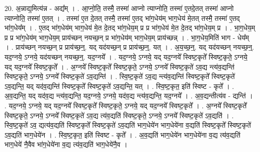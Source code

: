 \documentclass[17pt]{extarticle}
\begin{document}
20. अ॒न्नाद्य॒मित्य॑न्न - अद्य᳚म् । . आ॒प्नो॒ति॒ तस्मै॒ तस्मा॑ आप्नो त्याप्नोति॒ तस्मा॑ ए॒तदे॒तत् तस्मा॑ आप्नो त्याप्नोति॒ तस्मा॑ ए॒तत् । . तस्मा॑ ए॒त दे॒तत् तस्मै॒ तस्मा॑ ए॒तद् भा॑ग॒धेय॑म् भाग॒धेय॑ मे॒तत् तस्मै॒ तस्मा॑ ए॒तद् भा॑ग॒धेय᳚म् । . ए॒तद् भा॑ग॒धेय॑म् भाग॒धेय॑ मे॒त दे॒तद् भा॑ग॒धेय॒म् प्र प्र भा॑ग॒धेय॑ मे॒त दे॒तद् भा॑ग॒धेय॒म् प्र । . भा॒ग॒धेय॒म् प्र प्र भा॑ग॒धेय॑म् भाग॒धेय॒म् प्राय॑च्छन् नयच्छ॒न् प्र भा॑ग॒धेय॑म् भाग॒धेय॒म् प्राय॑च्छन्न् । . भा॒ग॒धेय॒मिति॑ भाग - धेय᳚म् । . प्राय॑च्छन् नयच्छ॒न् प्र प्राय॑च्छ॒न्॒. यद् यद॑यच्छ॒न् प्र प्राय॑च्छ॒न्॒. यत् । . अ॒य॒च्छ॒न्॒. यद् यद॑यच्छन् नयच्छ॒न्॒. यद॒ग्नये॒ ऽग्नये॒ यद॑यच्छन् नयच्छ॒न्॒. यद॒ग्नये᳚ । . यद॒ग्नये॒ ऽग्नये॒ यद् यद॒ग्नये᳚ स्विष्ट॒कृते᳚ स्विष्ट॒कृते॒ ऽग्नये॒ यद् यद॒ग्नये᳚ स्विष्ट॒कृते᳚ । . अ॒ग्नये᳚ स्विष्ट॒कृते᳚ स्विष्ट॒कृते॒ ऽग्नये॒ ऽग्नये᳚ स्विष्ट॒कृते॑ ऽव॒द्य न्त्य॑व॒द्यन्ति॑ स्विष्ट॒कृते॒ ऽग्नये॒ ऽग्नये᳚ स्विष्ट॒कृते॑ ऽव॒द्यन्ति॑ । . स्वि॒ष्ट॒कृते॑ ऽव॒द्य न्त्य॑व॒द्यन्ति॑ स्विष्ट॒कृते᳚ स्विष्ट॒कृते॑ ऽव॒द्यन्ति॒ यद् यद॑व॒द्यन्ति॑ स्विष्ट॒कृते᳚ स्विष्ट॒कृते॑ ऽव॒द्यन्ति॒ यत् । . स्वि॒ष्ट॒कृत॒ इति॑ स्विष्ट - कृते᳚ । . अ॒व॒द्यन्ति॒ यद् यद॑व॒द्य न्त्य॑व॒द्यन्ति॒ यद॒ग्नये॒ ऽग्नये॒ यद॑व॒द्य न्त्य॑व॒द्यन्ति॒ यद॒ग्नये᳚ । . अ॒व॒द्यन्तीत्य॑व - द्यन्ति॑ । . यद॒ग्नये॒ ऽग्नये॒ यद् यद॒ग्नये᳚ स्विष्ट॒कृते᳚ स्विष्ट॒कृते॒ ऽग्नये॒ यद् यद॒ग्नये᳚ स्विष्ट॒कृते᳚ । . अ॒ग्नये᳚ स्विष्ट॒कृते᳚ स्विष्ट॒कृते॒ ऽग्नये॒ ऽग्नये᳚ स्विष्ट॒कृते॑ ऽव॒द्य त्य॑व॒द्यति॑ स्विष्ट॒कृते॒ ऽग्नये॒ ऽग्नये᳚ स्विष्ट॒कृते॑ ऽव॒द्यति॑ । . स्वि॒ष्ट॒कृते॑ ऽव॒ द्यत्य॑व॒द्यति॑ स्विष्ट॒कृते᳚ स्विष्ट॒कृते॑ ऽव॒द्यति॑ भाग॒धेये॑न भाग॒धेये॑ना व॒द्यति॑ स्विष्ट॒कृते᳚ स्विष्ट॒कृते॑ ऽव॒द्यति॑ भाग॒धेये॑न । . स्वि॒ष्ट॒कृत॒ इति॑ स्विष्ट - कृते᳚ । . अ॒व॒द्यति॑ भाग॒धेये॑न भाग॒धेये॑ना व॒द्य त्य॑व॒द्यति॑ भाग॒धेये॑ नै॒वैव भा॑ग॒धेये॑ना व॒द्य त्य॑व॒द्यति॑ भाग॒धेये॑नै॒व । \newline
\end{document}
